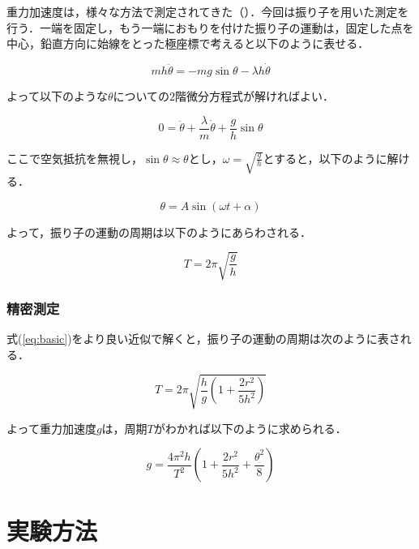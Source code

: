 \documentclass[uplatex,dvipdfmx,a4paper,10pt]{jsarticle}
\begin{document}
重力加速度は，様々な方法で測定されてきた（\cite{jihou}）．今回は振り子を用いた測定を行う．一端を固定し，もう一端におもりを付けた振り子の運動は，固定した点を中心，鉛直方向に始線をとった極座標で考えると以下のように表せる．

\begin{equation}
    mh\ddot{\theta} = -mg\sin{\theta} - \lambda h\dot{\theta}
\end{equation}

よって以下のような$\theta$についての$2$階微分方程式が解ければよい．

\begin{equation}\label{eq:basic}
    0 = \ddot{\theta} + \frac{\lambda}{m}\dot{\theta} + \frac{g}{h}\sin{\theta}
\end{equation}

ここで空気抵抗を無視し，$\sin{\theta} \approx \theta$とし，$\omega = \sqrt{\frac{g}{h}}$とすると，以下のように解ける．

\begin{equation}
    \theta = A\sin\left( \omega t + \alpha \right)
\end{equation}

よって，振り子の運動の周期は以下のようにあらわされる．

\begin{equation}
    T = 2\pi\sqrt{\frac{g}{h}}
\end{equation}

\subsubsection{精密測定}

式(\ref{eq:basic})をより良い近似で解くと，振り子の運動の周期は次のように表される．

\begin{equation}
    T = 2\pi\sqrt{\frac{h}{g}\left( 1 + \frac{2r^2}{5h^2} \right)}
\end{equation}

よって重力加速度$g$は，周期$T$がわかれば以下のように求められる．

\begin{equation}
    g = \frac{4\pi^2h}{T^2}\left( 1 + \frac{2r^2}{5h^2} + \frac{\theta^2}{8} \right)
\end{equation}

\section{実験方法}
\end{document}
